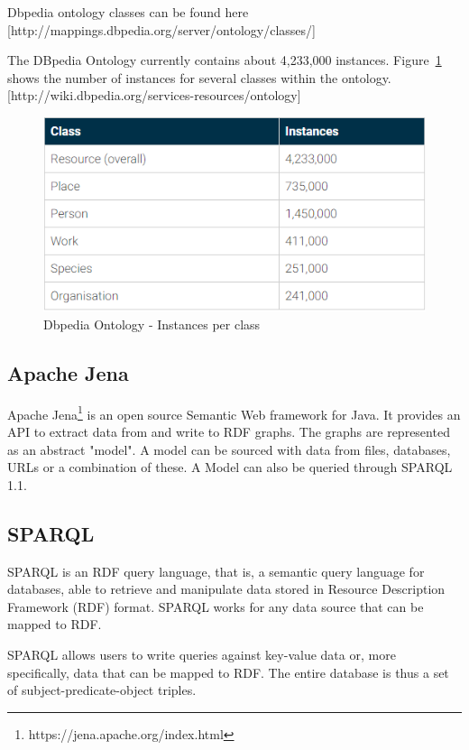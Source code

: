 \documentclass[thesis=M,english]{FITthesis}[2018/05/30]
\begin{document}
Dbpedia ontology classes can be found here [http://mappings.dbpedia.org/server/ontology/classes/]

The DBpedia Ontology currently contains about 4,233,000 instances. Figure~\ref{fig:Dbpedia-ontology} shows the number of instances for several classes within the ontology. [http://wiki.dbpedia.org/services-resources/ontology]

	\begin{figure}[H]\centering
		\includegraphics[width=\textwidth]{Dbpedia-ontology}
		\caption{Dbpedia Ontology - Instances per class}\label{fig:Dbpedia-ontology}
	\end{figure}

\subsection{Apache Jena}\label{ApacheJena}
Apache Jena\footnote{https://jena.apache.org/index.html} \cite{wiki:ApacheJena} is an open source Semantic Web framework for Java. It provides an API to extract data from and write to RDF graphs. The graphs are represented as an abstract "model". A model can be sourced with data from files, databases, URLs or a combination of these. A Model can also be queried through SPARQL 1.1.

\subsection{SPARQL}\label{SPARQL}
SPARQL \cite{master:SPARQL} is an RDF query language, that is, a semantic query language for databases, able to retrieve and manipulate data stored in Resource Description Framework (RDF) format. SPARQL works for any data source that can be mapped to RDF.

SPARQL allows users to write queries against key-value data or, more specifically, data that can be mapped to RDF. The entire database is thus a set of subject-predicate-object triples.
\end{document}
